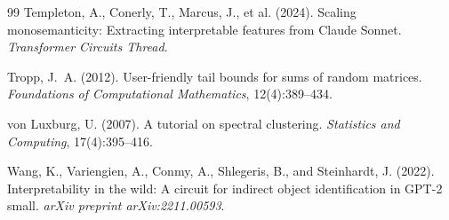 \documentclass[11pt]{article}
\newcommand{\1}{\mathbbm{1}}
\begin{document}
\begin{thebibliography}{99}
Templeton, A., Conerly, T., Marcus, J., et al. (2024).
\newblock Scaling monosemanticity: Extracting interpretable features from {Claude} {Sonnet}.
\newblock \emph{Transformer Circuits Thread}.

Tropp, J.~A. (2012).
\newblock User-friendly tail bounds for sums of random matrices.
\newblock \emph{Foundations of Computational Mathematics}, 12(4):389--434.

von Luxburg, U. (2007).
\newblock A tutorial on spectral clustering.
\newblock \emph{Statistics and Computing}, 17(4):395--416.

Wang, K., Variengien, A., Conmy, A., Shlegeris, B., and Steinhardt, J. (2022).
\newblock Interpretability in the wild: A circuit for indirect object identification in {GPT-2} small.
\newblock \emph{arXiv preprint arXiv:2211.00593}.

\end{thebibliography}
\end{document}
